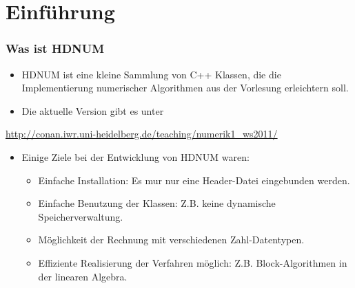 \section{Einführung}


\begin{frame}
\frametitle{Was ist HDNUM}
\begin{itemize}
\item HDNUM ist eine kleine Sammlung von C++ Klassen, die die
  Implementierung numerischer Algorithmen aus der Vorlesung
  erleichtern soll.

\item Die aktuelle Version gibt es unter
\end{itemize}

\begin{center}
  {\small\url{http://conan.iwr.uni-heidelberg.de/teaching/numerik1_ws2011/}}
\end{center}

\begin{itemize}
\item Einige Ziele bei der Entwicklung von HDNUM waren:
\begin{itemize}
\item Einfache Installation: Es mur nur eine Header-Datei eingebunden werden.
\item Einfache Benutzung der Klassen: Z.B. keine dynamische
  Speicherverwaltung.
\item Möglichkeit der Rechnung mit verschiedenen Zahl-Datentypen.
\item Effiziente Realisierung der Verfahren möglich:
  Z.B. Block-Algorithmen in der linearen Algebra.
\end{itemize}
\end{itemize}

\end{frame}

